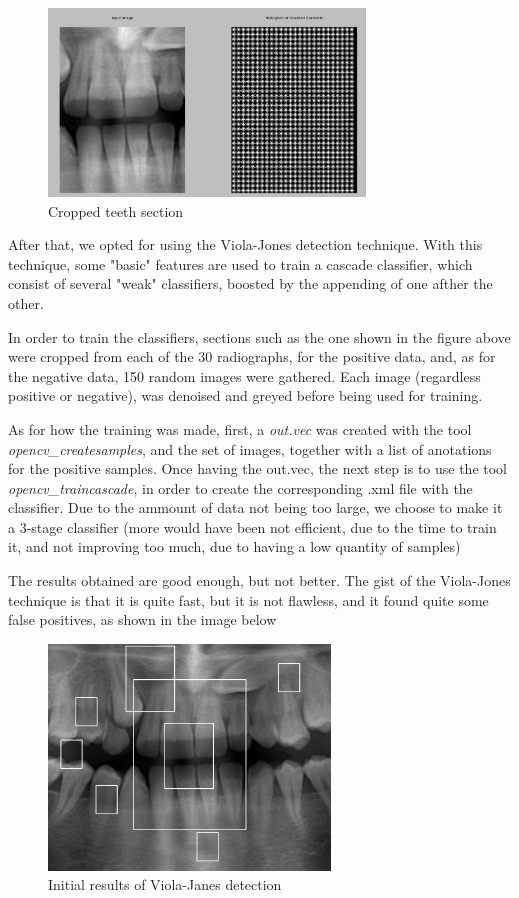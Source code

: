 \begin{figure}[h]
  \centering
  \includegraphics[height=5cm]{img/teeth_hog}
  \caption{Cropped teeth section}
\end{figure}

After that, we opted for using the Viola-Jones detection technique. With this
technique, some "basic" features are used to train a cascade classifier, which
consist of several "weak" classifiers, boosted by the appending of one afther
the other. 

In order to train the classifiers, sections such as the one shown in the figure
above were cropped from each of the 30 radiographs, for the positive data, and,
as for the negative data, 150 random images were gathered. Each image
(regardless positive or negative), was denoised and greyed before being used for
training. 

As for how the training was made, first, a \textit{out.vec} was created with the
tool \textit{opencv\_createsamples}, and the set of images, together with a list
of anotations for the positive samples. Once having the out.vec, the next step
is to use the tool \textit{opencv\_traincascade}, in order to create the
corresponding .xml file with the classifier. Due to the ammount of data not
being too large, we choose to make it a 3-stage classifier (more would have been
not efficient, due to the time to train it, and not improving too much, due to
having a low quantity of samples)

The results obtained are good enough, but not better. The gist of
the Viola-Jones technique is that it is quite fast, but it is not flawless, and
it found quite some false positives, as shown in the image below

\begin{figure}[h]
  \centering
  \includegraphics[height=6cm]{img/teeth_detection_1}
  \caption{Initial results of Viola-Janes detection}
\end{figure}

